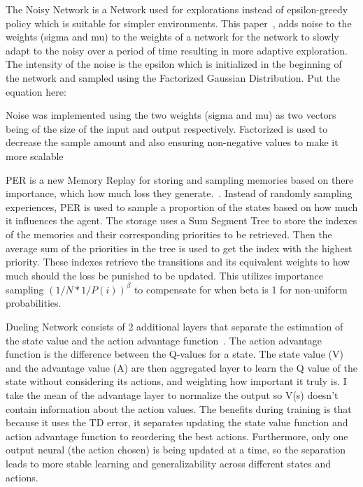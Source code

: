 \documentclass{article}
\begin{document}
The Noisy Network is a Network used for explorations instead of epsilon-greedy policy which is suitable for simpler environments. 
This paper~\cite{fortunato_noisy_2019}, adds noise to the weights (sigma and mu) to the weights of a network for the network to slowly adapt to the noisy over a period of time resulting in more adaptive exploration.
The intensity of the noise is the epsilon which is initialized in the beginning of the network and sampled using the Factorized Gaussian Distribution.
Put the equation here:

Noise was implemented using the two weights (sigma and mu) as two vectors being of the size of the input and output respectively.
Factorized is used to decrease the sample amount and also ensuring non-negative values to make it more scalable


PER is a new Memory Replay for storing and sampling memories based on there importance, which how much loss they generate.~\cite{schaul_prioritized_2016}.
Instead of randomly sampling experiences, PER is used to sample a proportion of the states based on how much it influences the agent.
The storage uses a Sum Segment Tree to store the indexes of the memories and their corresponding priorities to be retrieved.
Then the average sum of the priorities in the tree is used to get the index with the highest priority.
These indexes retrieve the transitions and its equivalent weights to how much should the loss be punished to be updated.
This utilizes importance sampling \((1/N * 1/P(i))^{\beta}\) to compensate for when beta is 1 for non-uniform probabilities.


Dueling Network consists of 2 additional layers that separate the estimation of the state value and the action advantage function~\cite{wang_dueling_2016}.
The action advantage function is the difference between the Q-values for a state.
The state value (V) and the advantage value (A) are then aggregated layer to learn the Q value of the state without considering its actions, and weighting how important it truly is.
I take the mean of the advantage layer to normalize the output so V(s) doesn't contain information about the action values.
The benefits during training is that because it uses the TD error, it separates updating the state value function and action advantage function to reordering the best actions.
Furthermore, only one output neural (the action chosen) is being updated at a time, so the separation leads to more stable learning and generalizability across different states and actions.
\end{document}

